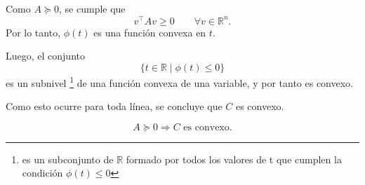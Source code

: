 \begin{itemize}
    Como \(A\succeq 0\), se cumple que
    \[
    v^\top A v\geq 0
    \qquad
    \forall v\in\mathbb{R}^n.
    \]
    Por lo tanto, \(\phi(t)\) es una función convexa en \(t\).

    Luego, el conjunto
    \[
    \{t\in\mathbb{R}\mid \phi(t)\leq 0\}
    \]
    es un subnivel \footnote{es un subconjunto de $\mathbb{R}$ formado por todos los valores de t que cumplen la condición $ϕ(t)≤0$} de una función convexa de una variable, y por tanto es convexo.

    Como esto ocurre para toda línea, se concluye que \(C\) es convexo.

    \[
    A\succeq 0 \Rightarrow C\text{ es convexo.}
    \]
\end{itemize}
